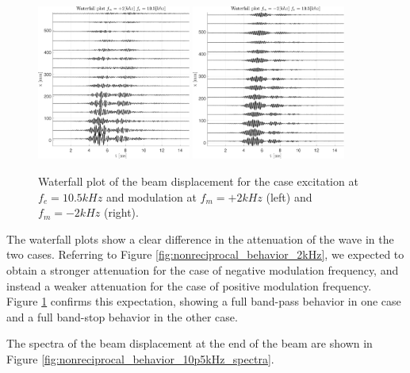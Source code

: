 \begin{figure}[H]
    \centering
    \includegraphics[width=0.45\textwidth]{img/MATLAB/EXP_Scan_time_narrow10p5kHz_2000plus.unv.pdf}
    \hspace{1cm}
    \includegraphics[width=0.45\textwidth]{img/MATLAB/EXP_Scan_time_narrow10p5kHz_2000minus.unv.pdf}
    \caption{Waterfall plot of the beam displacement for the case excitation at $f_e = 10.5 kHz$ and modulation at $f_m = +2 kHz$ (left) and $f_m = -2 kHz$ (right).}
    \label{fig:nonreciprocal_behavior_10p5kHz}
\end{figure}

The waterfall plots show a clear difference in the attenuation of the wave in the two cases.
Referring to Figure \ref{fig:nonreciprocal_behavior_2kHz}, we expected to obtain a stronger attenuation for the case of negative modulation frequency, and instead a weaker attenuation for the case of positive modulation frequency.
Figure \ref{fig:nonreciprocal_behavior_10p5kHz} confirms this expectation, showing a full band-pass behavior in one case and a full band-stop behavior in the other case.

The spectra of the beam displacement at the end of the beam are shown in Figure \ref{fig:nonreciprocal_behavior_10p5kHz_spectra}.

